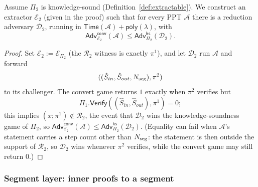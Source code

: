 \begin{lemma}\label{lem:convert}
Assume $\Pi_2$ is knowledge-sound (Definition~\ref{def:extractable}).
We construct an extractor $\mathcal{E}_2$ (given in the proof) such that for every PPT
$\mathcal{A}$ there is a reduction adversary $\mathcal{D}_2$, running in
$\mathsf{Time}(\mathcal{A})+\mathsf{poly}(\lambda)$, with
\[
  \mathsf{Adv}^{\mathsf{conv}}_{\mathcal{E}_2}(\mathcal{A})
  \le \mathsf{Adv}^{\mathsf{ks}}_{\Pi_2}(\mathcal{D}_2).
\]
\end{lemma}

\begin{proof}
Set $\mathcal{E}_2:=\mathcal{E}_{\Pi_2}$ (the $\mathcal{R}_2$ witness is exactly
$\pi^1$), and let $\mathcal{D}_2$ run $\mathcal{A}$ and forward
\[
  ((\hat{S}_{in},\hat{S}_{out},N_{\mathrm{seg}}),\pi^2)
\]
to its challenger. The convert
game returns $1$ exactly when $\pi^2$ verifies but
\[
  \Pi_1.\mathsf{Verify}((\hat{S}_{in},\hat{S}_{out}),\pi^1)=0;
\]
this implies
$(x;\pi^1)\notin\mathcal{R}_2$, the event that $\mathcal{D}_2$ wins the
knowledge-soundness game of $\Pi_2$, so
$\mathsf{Adv}^{\mathsf{conv}}_{\mathcal{E}_2}(\mathcal{A})\le
\mathsf{Adv}^{\mathsf{ks}}_{\Pi_2}(\mathcal{D}_2)$.  (Equality can fail when
$\mathcal{A}$'s statement carries a step count other than $N_{\mathrm{seg}}$: the
statement is then outside the support of $\mathcal{R}_2$, so $\mathcal{D}_2$
wins whenever $\pi^2$ verifies, while the convert game may still return
$0$.)
\end{proof}

\subsubsection{Segment layer: inner proofs to a segment}\label{sec:lem:segment}

